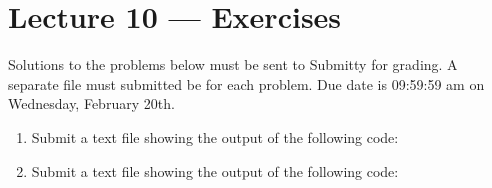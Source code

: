 \documentclass[letterpaper,10pt,english]{sphinxmanual}
\begin{document}
\chapter{Lecture 10 — Exercises}
\label{\detokenize{lecture_notes/lec10_lists2_exercises/exercises:lecture-10-exercises}}\label{\detokenize{lecture_notes/lec10_lists2_exercises/exercises::doc}}
Solutions to the problems below must be sent to Submitty for grading.
A separate file must submitted be for each problem.
Due date is 09:59:59 am on Wednesday, February 20th.
\begin{enumerate}
\def\theenumi{\arabic{enumi}}
\def\labelenumi{\theenumi .}
\makeatletter\def\p@enumii{\p@enumi \theenumi .}\makeatother
\item {} 
Submit a text file showing the output of the following code:

\begin{sphinxVerbatim}[commandchars=\\\{\}]
  \PYG{p}{[}  \PYG{p}{[} \PYG{p}{]} \PYG{p}{]}
  
  
\end{sphinxVerbatim}

\item {} 
Submit a text file showing the output of the following code:

\begin{sphinxVerbatim}[commandchars=\\\{\}]
 
      
      
     

  \PYG{p}{[}\PYG{p}{[} \PYG{p}{]} \PYG{p}{]}
  
  
\PYG{p}{[}\PYG{p}{]}  
 


\end{sphinxVerbatim}
\end{enumerate}
\end{document}
